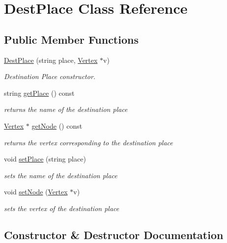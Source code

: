 \hypertarget{class_dest_place}{}\section{Dest\+Place Class Reference}
\label{class_dest_place}
\subsection*{Public Member Functions}
\begin{DoxyCompactItemize}
\item 
\hyperlink{class_dest_place_a86ec257bd93babe12ea90f0aa4a90f9d}{Dest\+Place} (string place, \hyperlink{class_vertex}{Vertex} $\ast$v)
\begin{DoxyCompactList}\small\item\em Destination Place constructor. \end{DoxyCompactList}\item 
string \hyperlink{class_dest_place_a12ddb542096ab0aca2fe5f0ac3d3e4e7}{get\+Place} () const
\begin{DoxyCompactList}\small\item\em returns the name of the destination place \end{DoxyCompactList}\item 
\hyperlink{class_vertex}{Vertex} $\ast$ \hyperlink{class_dest_place_ae66b6fb430724567fa11d8cdd9072502}{get\+Node} () const
\begin{DoxyCompactList}\small\item\em returns the vertex corresponding to the destination place \end{DoxyCompactList}\item 
void \hyperlink{class_dest_place_acf1a352c9061e706bbb6fd360273505c}{set\+Place} (string place)
\begin{DoxyCompactList}\small\item\em sets the name of the destination place \end{DoxyCompactList}\item 
void \hyperlink{class_dest_place_a8aef31bff80b7fac1ce940a7805efb57}{set\+Node} (\hyperlink{class_vertex}{Vertex} $\ast$v)
\begin{DoxyCompactList}\small\item\em sets the vertex of the destination place \end{DoxyCompactList}\end{DoxyCompactItemize}


\subsection{Constructor \& Destructor Documentation}
\hypertarget{class_dest_place_a86ec257bd93babe12ea90f0aa4a90f9d}{}\label{class_dest_place_a86ec257bd93babe12ea90f0aa4a90f9d} 
